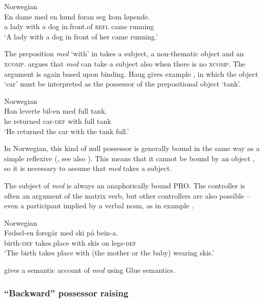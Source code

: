 \documentclass[output=paper,hidelinks]{langscibook}
\begin{document}
\ea\label{ex:Scandinavian:71} Norwegian \citep[376]{Lodrup99b}\\
\gll
 {En} {dame} {med} {en} {hund} {foran} {seg} {kom} {løpende.}\\
 a lady with a dog in.front.of \textsc{refl} came running\\
\glt `A lady with a dog in front of her came running.'\z

\noindent The preposition \textit{med} `with' in  takes a subject, a non-thematic object and an \textsc{xcomp}. \citet{Haug09} argues that \textit{med} can take a subject also when there is no \textsc{xcomp}. The argument is again based upon binding. Haug gives example , in which the object `car' must be interpreted as the possessor of the prepositional object `tank'.



\ea\label{ex:Scandinavian:72} Norwegian \citep[343]{Haug09}\\
\gll
 {Han} {leverte} {bil-en} {med} {full} {tank.}\\
 he returned car-\textsc{def} with full tank\\
\glt `He returned the car with the tank full.'\z

\noindent In Norwegian, this kind of null possessor is generally bound in the same way as a simple reflexive (\citealt{Lodrup99b,Lodrup10}, see also ). This means that it cannot be bound by an object \citep[95]{Lodrup10}, so it is necessary to assume that \textit{med} takes a subject.

 The subject of \textit{med} is always an anaphorically bound PRO. The controller is often an argument of the matrix verb, but other controllers are also possible -- even a participant implied by a verbal noun, as in example .



\ea\label{ex:Scandinavian:73} Norwegian \citep[340]{Haug09}\\
\gll
 {Fødsel-en} {foregår} {med} {ski} {på} {bein-a.}\\
 birth-\textsc{def} takes.place with skis on legs-\textsc{def}\\
\glt `The birth takes place with (the mother or the baby) wearing skis.'\z

\noindent \citet{Haug09} gives a semantic account of \textit{med} using Glue semantics.

\subsubsection{``Backward'' possessor raising}
\label{sec:Scandinavian:3.7.5}
\end{document}
